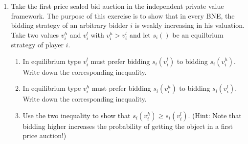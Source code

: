 \documentclass[a4paper,12pt]{article}
\begin{document}
\begin{enumerate}

\item Take the first price sealed bid auction in the independent private value framework. The purpose of this exercise is to show that in every BNE, the bidding strategy of an arbitrary bidder $i$ is weakly increasing in his valuation. Take two values $v_i^h$ and $v_i^l$ with $v_i^h>v_i^l$ and let $s_i()$ be an equilbrium strategy of player $i$.
  \begin{enumerate}
  \item In equilibrium type $v_i^l$ must prefer bidding $s_i(v_i^l)$ to bidding $s_i(v_i^h)$. Write down the corresponding inequality.
  \item In equilibrium type $v_i^h$ must prefer bidding $s_i(v_i^h)$ to bidding $s_i(v_i^l)$. Write down the corresponding inequality.
  \item Use the two inequality to show that $s_i(v_i^h)\geq s_i(v_i^l)$. (Hint: Note that bidding higher increases the probability of getting the object in a first price auction!)
  \end{enumerate}
  

\end{enumerate}
\end{document}
